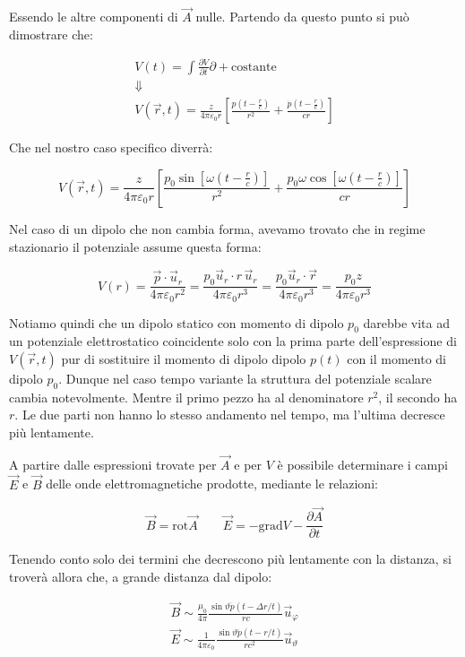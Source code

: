 Essendo le altre componenti di $\vec{A}$ nulle. Partendo da questo punto si può dimostrare che:

\begin{gather*}
	V(t)=\int \frac{\partial V}{\partial t} \partial + \text{costante}\\
	\Downarrow\\
	V(\vec{r},t) = \frac{z}{4\pi \varepsilon_0 r}\left[ \frac{p(t-\frac{r}{c})}{r^2} + \frac{\dot{p}(t-\frac{r}{c})}{cr}\right]
\end{gather*}

Che nel nostro caso specifico diverrà:

\[
	\boxed{V(\vec{r},t) = \frac{z}{4\pi \varepsilon_0 r}\left[ \frac{p_0\sin [\omega(t-\frac{r}{c})]}{r^2} + \frac{p_0\omega\cos [\omega(t-\frac{r}{c})]}{cr}\right]}
\]

Nel caso di un dipolo che non cambia forma, avevamo trovato che in regime stazionario il potenziale assume questa forma:

\[
	V(r) = \frac{\vec{p} \cdot \vec{u}_r}{4\pi \varepsilon_0 r^2} = \frac{p_0\vec{u}_r\cdot r\,\vec{u}_r}{4\pi \varepsilon_0 r^3} = \frac{p_0\vec{u}_r\cdot \vec{r}}{4\pi \varepsilon_0 r^3} = \frac{p_0z}{4\pi \varepsilon_0 r^3}
\]

Notiamo quindi che un dipolo statico con momento di dipolo $ p_0  $ darebbe vita ad un potenziale elettrostatico coincidente solo con la prima parte dell'espressione di $V(\vec{r}, t)$ pur di sostituire il momento di dipolo dipolo $p(t)$ con il momento di dipolo $p_0 $. Dunque nel caso tempo variante la struttura del potenziale scalare cambia notevolmente. Mentre il primo pezzo ha al denominatore $r^2$, il secondo ha $r$. Le due parti non hanno lo stesso andamento nel tempo, ma l'ultima decresce più lentamente.

A partire dalle espressioni trovate per $\vec{A}$ e per $V$ è possibile determinare i campi $\vec{E}$ e $\vec{B}$ delle onde elettromagnetiche prodotte, mediante le relazioni:

\[
	\vec{B} =\text{rot}\vec{A} \qquad \vec{E} =-\text{grad}V - \frac{\partial \vec{A}}{\partial t}
\]

Tenendo conto solo dei termini che decrescono più lentamente con la distanza, si troverà allora che, a grande distanza dal dipolo:

\begin{gather*}
	\vec{B} \sim \frac{\mu_0}{4\pi} \frac{\sin \vartheta \ddot{p}(t-\Delta r/t)}{rc}\vec{u}_{\varphi}\\
	\vec{E} \sim \frac{1}{4\pi \varepsilon_0}\frac{\sin \vartheta \ddot{p}(t-r/t)}{rc^2} \vec{u}_\vartheta
\end{gather*}

